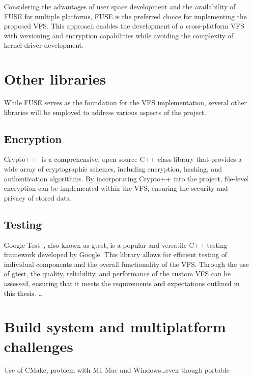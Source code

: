Considering the advantages of user space development and the availability of FUSE for multiple platforms, FUSE is the preferred choice for implementing the proposed VFS.
This approach enables the development of a cross-platform VFS with versioning and encryption capabilities while avoiding the complexity of kernel driver development.

\section{Other libraries}\label{sec:other-libraries-analysis}

While FUSE serves as the foundation for the VFS implementation, several other libraries will be employed to address various aspects of the project.

\subsection{Encryption}\label{subsec:encryption-analysis}

Crypto++~\cite{crypto_pp} is a comprehensive, open-source C++ class library that provides a wide array of cryptographic schemes, including encryption, hashing, and authentication algorithms.
By incorporating Crypto++ into the project, file-level encryption can be implemented within the VFS, ensuring the security and privacy of stored data.

\subsection{Testing}\label{subsec:gtest}

Google Test~\cite{google_test}, also known as gtest, is a popular and versatile C++ testing framework developed by Google.
This library allows for efficient testing of individual components and the overall functionality of the VFS. Through the use of gtest, the quality, reliability, and performance of the custom VFS can be assessed, ensuring that it meets the requirements and expectations outlined in this thesis.
\ldots

\section{Build system and multiplatform challenges}\label{sec:build-system-and-multiplatform-challenges}

Use of CMake, problem with M1 Mac and Windows\ldots even though portable